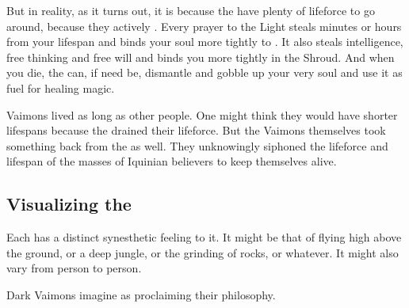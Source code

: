But in reality, as it turns out, it is because the \sephiroth{} have plenty of lifeforce to go around, because they actively . 
Every prayer to the Light steals minutes or hours from your lifespan and binds your soul more tightly to \iquin{}. 
It also steals intelligence, free thinking and free will and binds you more tightly in the Shroud. 
And when you die, the \sephiroth{} can, if need be, dismantle and gobble up your very soul and use it as fuel for healing magic. 

Vaimons lived as long as other people.
One might think they would have shorter lifespans because the \sephiroth drained their lifeforce. 
But the Vaimons themselves took something back from the \sephiroth as well. 
They unknowingly siphoned the lifeforce and lifespan of the masses of Iquinian believers to keep themselves alive. 









\subsection{Visualizing the \Archon}
Each \Archon{} has a distinct synesthetic feeling to it. 
It might be that of flying high above the ground, or a deep jungle, or the grinding of rocks, or whatever. 
It might also vary from person to person. 

Dark Vaimons imagine  as proclaiming their philosophy. 


